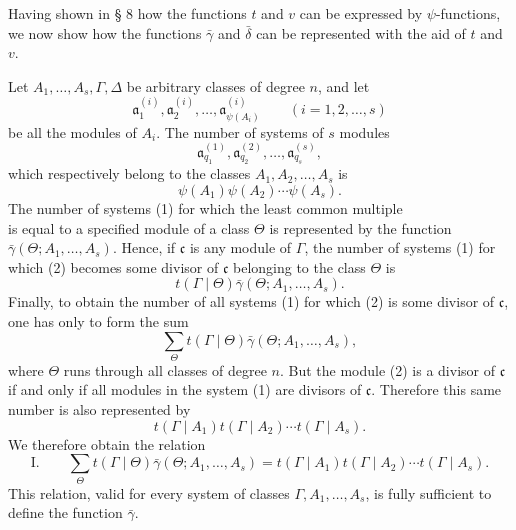 \documentclass[11pt,a4paper]{article}
\begin{document}
Having shown in § 8 how the functions $t$ and $v$ can be expressed by $\psi$-functions, we now show how the functions $\bar\gamma$ and $\bar\delta$ can be represented with the aid of $t$ and $v$.



Let $A_1,\ldots,A_s,\Gamma,\Delta$ be arbitrary classes of degree $n$, and let
\[
 \mathfrak a^{(i)}_1,\mathfrak a^{(i)}_2,\ldots,
 \mathfrak a^{(i)}_{\psi(A_i)}\qquad (i=1,2,\ldots,s)
\]
be all the modules of $A_i$. The number of systems of $s$ modules
\begin{equation}
 \mathfrak a^{(1)}_{q_1},\mathfrak a^{(2)}_{q_2},\ldots,
 \mathfrak a^{(s)}_{q_s},
\tag{1}
\end{equation}
which respectively belong to the classes $A_1,A_2,\ldots,A_s$ is
\[
 \psi(A_1)\psi(A_2)\cdots\psi(A_s).
\]
The number of systems (1) for which the least common multiple
\begin{equation}
 [\mathfrak a^{(1)}_{q_1},\mathfrak a^{(2)}_{q_2},\ldots,
 \mathfrak a^{(s)}_{q_s}]
\tag{2}
\end{equation}
is equal to a specified module of a class $\Theta$ is represented by the function $\bar\gamma(\Theta;A_1,\ldots,A_s)$. Hence, if $\mathfrak c$ is any module of $\Gamma$, the number of systems (1) for which (2) becomes some divisor of $\mathfrak c$ belonging to the class $\Theta$ is
\[
 t(\Gamma\mid\Theta)\bar\gamma(\Theta;A_1,\ldots,A_s).
\]
Finally, to obtain the number of all systems (1) for which (2) is some divisor of $\mathfrak c$, one has only to form the sum
\[
 \sum_{\Theta}t(\Gamma\mid\Theta)\bar\gamma(\Theta;A_1,\ldots,A_s),
\]
where $\Theta$ runs through all classes of degree $n$. But the module (2) is a divisor of $\mathfrak c$ if and only if all modules in the system (1) are divisors of $\mathfrak c$. Therefore this same number is also represented by
\[
 t(\Gamma\mid A_1)t(\Gamma\mid A_2)\cdots t(\Gamma\mid A_s).
\]
We therefore obtain the relation
\[
\text{I.}\qquad
 \sum_{\Theta}t(\Gamma\mid\Theta)\bar\gamma(\Theta;A_1,\ldots,A_s)
 =t(\Gamma\mid A_1)t(\Gamma\mid A_2)\cdots t(\Gamma\mid A_s).
\]
This relation, valid for every system of classes $\Gamma,A_1,\ldots,A_s$, is fully sufficient to define the function $\bar\gamma$.
\end{document}
